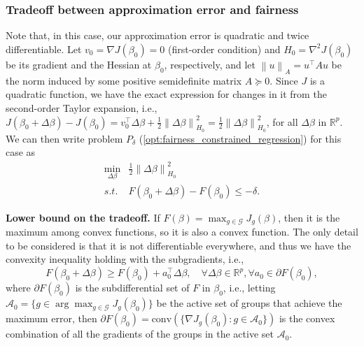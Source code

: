 \documentclass[11pt]{article}
\theoremstyle{plain}
\theoremstyle{definition}
\newcommand{\R}{\mathbb{R}}
\newcommand{\norm}[1]{\left\lVert #1 \right\rVert}
\newcommand{\1}{\mathbf{1}}
\newcommand{\G}{\mathcal{G}}
\newcommand{\A}{\mathcal{A}}
\renewcommand{\t}{^{\top}}
\renewcommand{\R}{\mathbb{R}}
\begin{document}
\subsubsection{Tradeoff between approximation error and fairness}

Note that, in this case, our approximation error is quadratic and twice differentiable. Let $v_0 = \nabla J(\beta_0)=0$ (first-order condition) and $H_0 = \nabla^2 J(\beta_0)$ be its gradient and the Hessian at $\beta_0$, respectively, and let $\norm{u}_{A}=u\t A u$ be the norm induced by some positive semidefinite matrix $A\succeq 0$. Since $J$ is a quadratic function, we have the exact expression for changes in it from the second-order Taylor expansion, i.e., $J(\beta_0 + \Delta \beta)-J(\beta_0)=v_0\t\Delta \beta + \frac{1}{2}\norm{\Delta \beta}^2_{H_0}= \frac{1}{2}\norm{\Delta \beta}^2_{H_0}$, for all $ \Delta \beta$ in $\R^p$. We can then write problem $P_\delta$ (\ref{opt:fairness_constrained_regression})  for this case as
\begin{equation}
\label{opt:intermediate_P_delta}
    \begin{array}{cc}
      \displaystyle  \min_{\Delta \beta} &  \frac{1}{2}\norm{\Delta \beta}^2_{H_0} \\
        s.t. & F(\beta_0 + \Delta \beta)-F(\beta_0) \leq -\delta. %
    \end{array}
\end{equation}

\noindent \textbf{Lower bound on the tradeoff.} If  $F(\beta)=\max_{g\in \G} J_g(\beta)$, then it is the maximum among convex functions, so it is also a convex function. The only detail to be considered is that it is not differentiable everywhere, and thus we have the convexity inequality holding with the subgradients, i.e.,  
    \begin{equation}
    \label{ineq:fairness_lower_bound_1}
    F(\beta_0 + \Delta \beta) \geq F(\beta_0 ) + a_0\t\Delta \beta   ,\quad \forall \Delta \beta \in \R^p, \forall a_0\in \partial F(\beta_0),    
    \end{equation}
    where $\partial F(\beta_0)$ is the subdifferential set of $F$ in $\beta_0$, i.e., letting $\A_0=\{g \in  \arg \max_{g\in \G} J_g(\beta_0)\}$ be the active set of groups that achieve the maximum error, then $\partial F(\beta_0)=\text{conv}(\{\nabla J_g(\beta_0): g\in \A_0 \})$ is the convex combination of all the gradients of the groups in the active set $\A_0$. 
\end{document}
